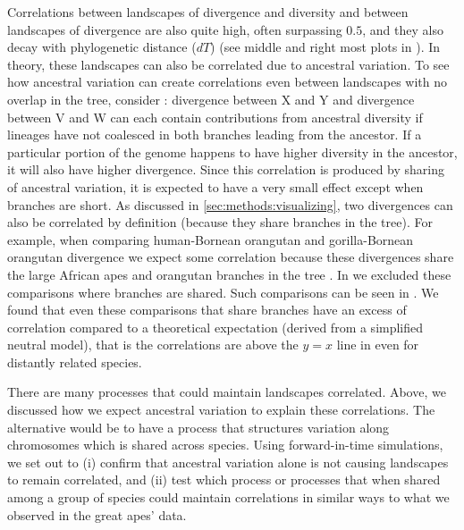 Correlations between landscapes of divergence and diversity and between landscapes of divergence are also quite high, often surpassing $0.5$, 
and they also decay with phylogenetic distance ($dT$) (see middle and right most plots in ).
In theory, these landscapes can also be correlated due to ancestral variation.
To see how ancestral variation can create correlations even between landscapes with no overlap in the tree, consider :
divergence between X and Y and divergence between V and W can each contain contributions from ancestral diversity if lineages have not coalesced in both branches leading from the ancestor.
If a particular portion of the genome happens to have higher diversity in the ancestor, it will also have higher divergence.
Since this correlation is produced by sharing of ancestral variation, it is expected to have a very small effect except when branches are short.
As discussed in \autoref{sec:methods:visualizing}, two divergences can also be correlated by definition (because they share branches in the tree).
For example, when comparing human-Bornean orangutan and gorilla-Bornean orangutan divergence we expect some correlation because these divergences share the large African apes and orangutan branches in the tree .
In  we excluded these comparisons where branches are shared.
Such comparisons can be seen in .
We found that even these comparisons that share branches have an excess of correlation compared to a theoretical expectation (derived from a simplified neutral model),
that is the correlations are above the $y=x$ line in  even for distantly related species.

There are many processes that could maintain landscapes correlated.
Above, we discussed how we expect ancestral variation to explain these correlations.
The alternative would be to have a process that structures variation along chromosomes which is shared across species.
Using forward-in-time simulations, 
we set out to (i) confirm that ancestral variation alone is not causing landscapes to remain correlated, 
and (ii) test which process or processes that when shared among a group of species could maintain correlations in similar ways to what we observed in the great apes' data. 

